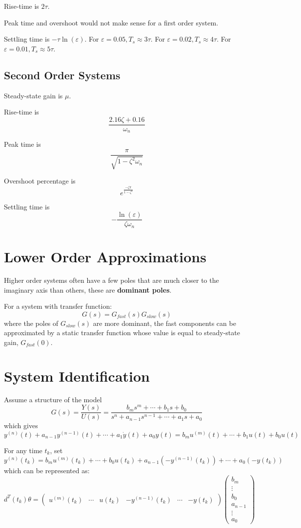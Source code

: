 \documentclass[11pt]{article}
\begin{document}
Rise-time is \(2 \tau\).

Peak time and overshoot would not make sense for a first order system.

Settling time is \(-\tau \ln(\varepsilon)\).
For \(\varepsilon = 0.05, T_{s} \approx 3\tau\).
For \(\varepsilon = 0.02, T_{s} \approx 4\tau\).
For \(\varepsilon = 0.01, T_{s} \approx 5\tau\).
\subsection{Second Order Systems}
\label{sec:org38001c4}
Steady-state gain is \(\mu\).

Rise-time is
$$
\frac{2.16 \zeta + 0.16}{\omega_{n}}
$$

Peak time is
$$
\frac{\pi}{\sqrt{1 - \zeta^{2} \omega_{n}}}
$$

Overshoot percentage is
$$
e^{\frac{-\zeta \pi}{1 - \zeta^{2}}}
$$

Settling time is
$$
-\frac{\ln(\varepsilon)}{\zeta \omega_{n}}
$$
\section{Lower Order Approximations}
\label{sec:org7855083}
Higher order systems often have a few poles that are much closer to the imaginary
axis than others, these are \textbf{dominant poles}.

For a system with transfer function:
$$
G(s) = G_{fast}(s) G_{slow}(s)
$$
where the poles of \(G_{slow}(s)\) are more dominant, the fast components can be
approximated by a static transfer function whose value is equal to steady-state
gain, \(G_{fast}(0)\).
\section{System Identification}
\label{sec:orgf19bb91}
Assume a structure of the model
$$G(s) = \frac{Y(s)}{U(s)} = \frac{b_{m} s^{m} + \cdots + b_{1} s + b_{0}}{s^{n} + a_{n-1} s^{n-1} + \cdots + a_{1} s + a_{0}}$$
which gives
$$y^{(n)}(t) + a_{n-1} y^{(n-1)}(t) + \cdots + a_{1} \dot{y}(t) + a_{0} y(t) = b_{m} u^{(m)}(t) + \cdots + b_{1} u(t) + b_{0} u(t)$$

For any time \(t_{k}\), set
$$
y^{(n)}(t_{k}) = b_{m}u^{(m)}(t_{k}) + \cdots + b_{0} u(t_{k})+ a_{n-1} \left( -y^{(n-1)} (t_{k}) \right) + \cdots + a_{0} (-y(t_{k}))
$$
which can be represented as:
$$ d^{T} (t_{k}) \theta = \begin{pmatrix} u^{(m)} (t_{k}) & \cdots & u(t_{k}) & -y^{(n-1)} (t_{k}) & \cdots & -y(t_{k}) \end{pmatrix} \begin{pmatrix} b_{m} \\ \vdots \\ b_{0} \\ a_{n-1} \\ \vdots \\ a_{0} \end{pmatrix} $$
\end{document}
